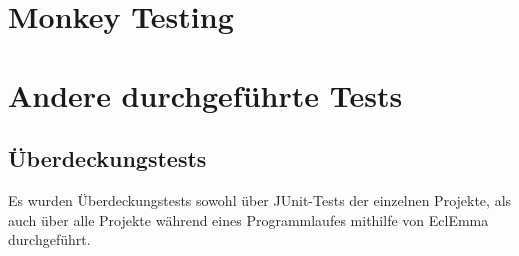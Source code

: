 \section{Monkey Testing}

\section{Andere durchgeführte Tests}
\subsection{Überdeckungstests}
Es wurden Überdeckungstests sowohl über JUnit-Tests der einzelnen Projekte, als auch über alle Projekte während eines Programmlaufes mithilfe von EclEmma durchgeführt.
